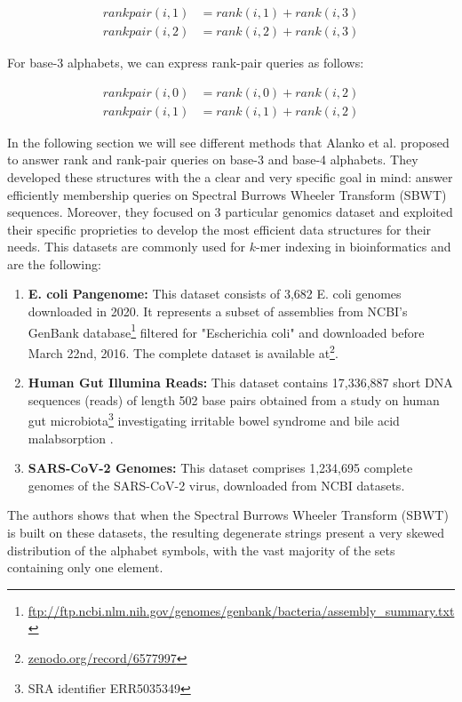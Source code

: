 \begin{align}
    rankpair(i,1) & = rank(i,1) + rank(i,3) \\
    rankpair(i,2) & = rank(i,2) + rank(i,3)
\end{align}

\noindent For base-3 alphabets, we can express rank-pair queries as follows:

\begin{align}
    rankpair(i,0) & = rank(i,0) + rank(i,2) \\
    rankpair(i,1) & = rank(i,1) + rank(i,2)
\end{align}

\noindent In the following section we will see different methods that Alanko et al. \cite{SubsetWT} proposed to answer rank and rank-pair queries on base-3 and base-4 alphabets. They developed these structures with the a clear and very specific goal in mind: answer efficiently membership queries on Spectral Burrows Wheeler Transform (SBWT) sequences. Moreover, they focused on 3 particular genomics dataset and exploited their specific proprieties to develop the most efficient data structures for their needs. This datasets are commonly used for $k$-mer indexing in bioinformatics and are the following:

\begin{enumerate} \label{datasets}
    \item \textbf{E. coli Pangenome:} This dataset consists of 3,682 E. coli genomes downloaded in 2020. It represents a subset of assemblies from NCBI's GenBank database\footnote{\url{ftp://ftp.ncbi.nlm.nih.gov/genomes/genbank/bacteria/assembly\_summary.txt}} filtered for "Escherichia coli" and downloaded before March 22nd, 2016. The complete dataset is available at\footnote{\url{zenodo.org/record/6577997}}.
    \item \textbf{Human Gut Illumina Reads:} This dataset contains 17,336,887 short DNA sequences (reads) of length 502 base pairs obtained from a study on human gut microbiota\footnote{SRA identifier ERR5035349} investigating irritable bowel syndrome and bile acid malabsorption \cite{jeffery2020differences}.
    \item \textbf{SARS-CoV-2 Genomes:} This dataset comprises 1,234,695 complete genomes of the SARS-CoV-2 virus, downloaded from NCBI datasets.
\end{enumerate}

\noindent The authors shows that when the Spectral Burrows Wheeler Transform (SBWT) is built on these datasets, the resulting degenerate strings present a very skewed distribution of the alphabet symbols, with the vast majority of the sets containing only one element.
